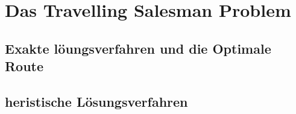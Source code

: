 \chapter{Das Travelling Salesman Problem}
\section{Exakte löungsverfahren und die Optimale Route}
\section{heristische Lösungsverfahren}